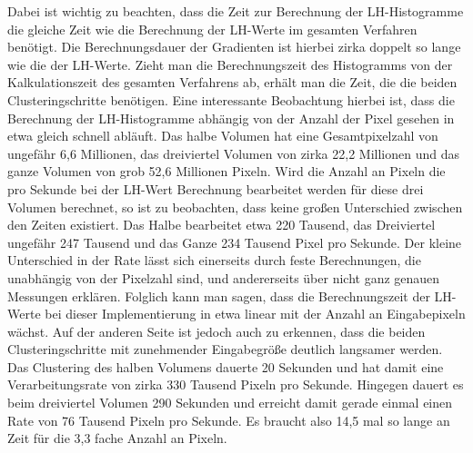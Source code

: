 Dabei ist wichtig zu beachten, dass die Zeit zur Berechnung der LH-Histogramme die gleiche Zeit wie die Berechnung der LH-Werte im gesamten Verfahren benötigt. Die Berechnungsdauer der Gradienten ist hierbei zirka doppelt so lange wie die der LH-Werte. Zieht man die Berechnungszeit des Histogramms von der Kalkulationszeit des gesamten Verfahrens ab, erhält man die Zeit, die die beiden Clusteringschritte benötigen.
\newline
Eine interessante Beobachtung hierbei ist, dass die Berechnung der LH-Histogramme abhängig von der Anzahl der Pixel gesehen in etwa gleich schnell abläuft. Das halbe Volumen hat eine Gesamtpixelzahl von ungefähr 6,6 Millionen, das dreiviertel Volumen von zirka 22,2 Millionen und das ganze Volumen von grob 52,6 Millionen Pixeln. Wird die Anzahl an Pixeln die pro Sekunde bei der LH-Wert Berechnung bearbeitet werden für diese drei Volumen berechnet, so ist zu beobachten, dass keine großen Unterschied zwischen den Zeiten existiert. Das Halbe bearbeitet etwa 220 Tausend, das Dreiviertel ungefähr 247 Tausend und das Ganze 234 Tausend Pixel pro Sekunde. Der kleine Unterschied in der Rate lässt sich einerseits durch feste Berechnungen, die unabhängig von der Pixelzahl sind, und andererseits über nicht ganz genauen Messungen erklären. Folglich kann man sagen, dass die Berechnungszeit der LH-Werte bei dieser Implementierung in etwa linear mit der Anzahl an Eingabepixeln wächst.
\newline
Auf der anderen Seite ist jedoch auch zu erkennen, dass die beiden Clusteringschritte mit zunehmender Eingabegröße deutlich langsamer werden. Das Clustering des halben Volumens dauerte 20 Sekunden und hat damit eine Verarbeitungsrate von zirka 330 Tausend Pixeln pro Sekunde. Hingegen dauert es beim dreiviertel Volumen 290 Sekunden und erreicht damit gerade einmal einen Rate von 76 Tausend Pixeln pro Sekunde. Es braucht also 14,5 mal so lange an Zeit für die 3,3 fache Anzahl an Pixeln.














































